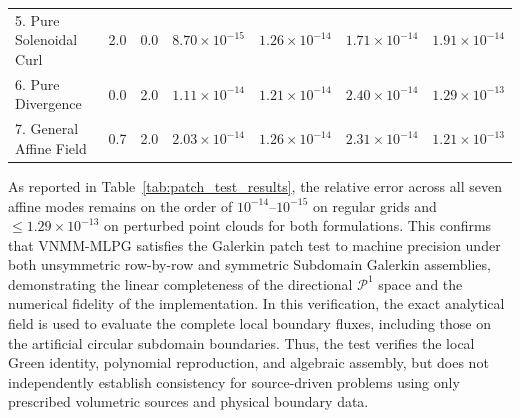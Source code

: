 \documentclass[VANCOUVER,Times1COL]{WileyNJD-v5}
\begin{document}
\begin{table}[!t]
{\begin{tabular}{lcccccc}
            5. Pure Solenoidal Curl    & 2.0                                      & 0.0                                 & $8.70 \times 10^{-15}$                                     & $1.26 \times 10^{-14}$                                     & $1.71 \times 10^{-14}$ & $1.91 \times 10^{-14}$ \\
            6. Pure Divergence         & 0.0                                      & 2.0                                 & $1.11 \times 10^{-14}$                                     & $1.21 \times 10^{-14}$                                     & $2.40 \times 10^{-14}$ & $1.29 \times 10^{-13}$ \\
            7. General Affine Field    & 0.7                                      & 2.0                                 & $2.03 \times 10^{-14}$                                     & $1.26 \times 10^{-14}$                                     & $2.31 \times 10^{-14}$ & $1.21 \times 10^{-13}$ \\
            \bottomrule
        \end{tabular}
    }
\end{table}

As reported in Table~\ref{tab:patch_test_results}, the relative error across all seven affine modes remains on the order of $10^{-14}\text{--}10^{-15}$ on regular grids and $\le 1.29 \times 10^{-13}$ on perturbed point clouds for both formulations. This confirms that VNMM-MLPG satisfies the Galerkin patch test to machine precision under both unsymmetric row-by-row and symmetric Subdomain Galerkin assemblies, demonstrating the linear completeness of the directional $\mathcal{P}^1$ space and the numerical fidelity of the implementation. In this verification, the exact analytical field is used to evaluate the complete local boundary fluxes, including those on the artificial circular subdomain boundaries. Thus, the test verifies the local Green identity, polynomial reproduction, and algebraic assembly, but does not independently establish consistency for source-driven problems using only prescribed volumetric sources and physical boundary data.
\end{document}
